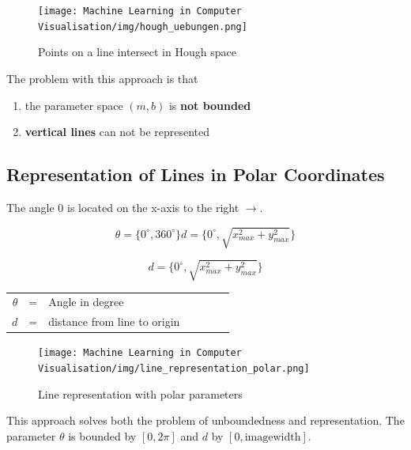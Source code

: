 \documentclass[x11names,11pt,a4paper]{article}
\theoremstyle{definition}
\begin{document}
\begin{figure}[H]
	\centering
	\texttt{[image: Machine Learning in Computer Visualisation/img/hough\_uebungen.png]}
	\caption{Points on a line intersect in Hough space}
	\label{fig:pointsrepresentationhough}
\end{figure}



\noindent
The problem with this approach is that
\begin{enumerate}[label=\alph*.]
	\item the parameter space $(m,b)$ is \textbf{not bounded}
	\item \textbf{vertical lines} can not be represented
\end{enumerate}

\subsection{Representation of Lines in Polar Coordinates}

The angle 0 is located on the x-axis to the right $\rightarrow$.

\begin{equation}
     \theta = \{0^\circ,360^\circ \}
     d = \{ 0^\circ, \sqrt{x_{max}^2 + y_{max}^2} \}
\end{equation}

\begin{equation}
     d = \{ 0^\circ, \sqrt{x_{max}^2 + y_{max}^2} \}
\end{equation}

 \begin{center}\begin{tabular}{rclcrcl}
   $\theta$ & = & Angle in degree\\ 
   $d$ & = & distance from line to origin \\
\end{tabular}\end{center}

\begin{figure}[H]
	\centering
	\texttt{[image: Machine Learning in Computer Visualisation/img/line\_representation\_polar.png]}
	\caption{Line representation with polar parameters}
	\label{fig:linerepresentationpolar}
\end{figure}

\noindent This approach solves both the problem of unboundedness and representation. The parameter $\theta$ is bounded by $[0,2\pi]$ and $d$ by $[0,\text{imagewidth}]$.
\end{document}
